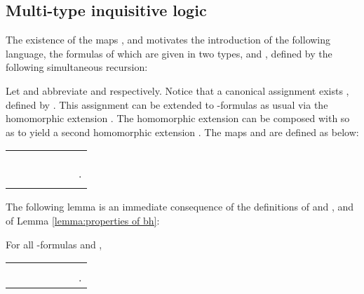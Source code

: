 \subsection{Multi-type inquisitive logic}
\label{ssec:multi-type Inql}
The existence of the maps ,  and  motivates the introduction of the following language, the formulas of which are given in two types,  and , defined by the following simultaneous recursion:
\begin{center}

\end{center}

Let  and  abbreviate  and   respectively.
Notice that a canonical assignment exists , defined by . This assignment can be extended to -formulas as usual via the homomorphic extension .
The homomorphic extension  can be composed with  so as to yield a second homomorphic extension .
The maps  and
 are defined as below:

\begin{center}
\begin{tabular}{r c l c r c l}
 && 
& \quad\quad\quad &
 && \\
 && 
&&
 && \\
 && 
&&
 && \\
 && 
&&
 && .\\
 && 
&&
\\
\end{tabular}
\end{center}
The following lemma is an immediate consequence of the definitions of  and  , and of Lemma \ref{lemma:properties of bh}:
\begin{lemma}
For all -formulas  and ,
\begin{center}
\begin{tabular}{r c l c r c l}
 && 
& \quad\quad\quad\quad\quad &
 && \\
 && 
&&
 && .\\
\end{tabular}
\end{center}
\end{lemma}


